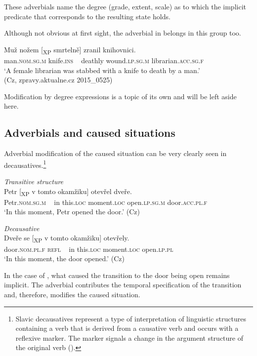\documentclass[output=paper]{langscibook}
\begin{document}
\noindent These adverbials name the degree (grade, extent, scale) as to which the implicit predicate that corresponds to the resulting state holds.

Although not obvious at first sight, the adverbial in  belongs in this group too.

\ea%
    \label{ex:junghanns:52}
\gll Muž nožem [\textsubscript{XP} smrtelně] zranil knihovnici.\\
  man.\textsc{nom.sg.m} knife.\textsc{ins} ~ deathly wound.\textsc{lp.sg.m} librarian.\textsc{acc.sg.f}\\
    \glt ‘A female librarian was stabbed with a knife to death by a man.’ \\ \hfill(Cz, zpravy.aktualne.cz 2015\_0525)
\z


\noindent Modification by degree expressions is a topic of its own and will be left aside here.

\subsection{Adverbials and caused situations}
\label{sec:junghanns:3.3}

Adverbial modification of the caused situation can be very clearly seen in decausatives.\footnote{Slavic decausatives represent a type of interpretation of linguistic structures containing a verb that is derived from a causative verb and occurs with a reflexive marker. The marker signals a change in the argument structure of the original verb (\citealt{Fehrmannetal2014}).}

\ea%
    \label{ex:junghanns:53}
  \ea    \textit{Transitive structure} \\
    \gll Petr [\textsubscript{XP} v tomto okamžiku] otevřel dveře.\\
        Petr.\textsc{nom.sg.m} ~ in this.\textsc{loc} moment.\textsc{loc} open.\textsc{lp.sg.m} door.\textsc{acc.pl.f}\\
    \glt ‘In this moment, Petr opened the door.’ \hfill (Cz)

  \ex    \textit{Decausative} \\
   \gll Dveře se [\textsubscript{XP} v tomto okamžiku] otevřely.\\
    door.\textsc{nom.pl.f} \textsc{refl} ~ in this.\textsc{loc} moment.\textsc{loc} open.\textsc{lp.pl}\\
    \glt ‘In this moment, the door opened.’ \hfill (Cz) \label{ex:junghanns:53b}
\z
\z

\noindent In the case of , what caused the transition to the door being open remains implicit. The adverbial contributes the temporal specification of the transition and, therefore, modifies the caused situation.
\end{document}
